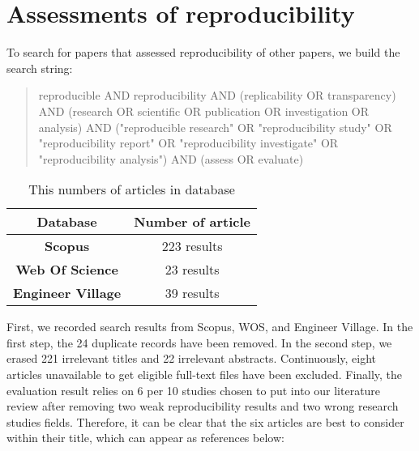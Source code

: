 \documentclass[
10pt, %
a4paper, %
oneside, %
headinclude,footinclude, %
BCOR5mm, %
]{scrartcl}
\begin{document}
\newpage %



\section{Assessments of reproducibility}
To search for papers that assessed reproducibility of other papers, we build the search string:
\begin{quote}
reproducible AND reproducibility AND (replicability OR transparency) AND (research OR scientific OR publication OR investigation OR analysis) AND ("reproducible research" OR "reproducibility study" OR "reproducibility report" OR "reproducibility investigate" OR 
"reproducibility analysis") AND (assess OR evaluate)
\end{quote}

\begin{table}[h]
\centering
\begin{tabular}{|c|clll|}
\hline
Database                	& \multicolumn{4}{c|}{\textbf{Number of article}}           \\ \hline
\textbf{Scopus} 			& \multicolumn{4}{c|}{{\color[HTML]{329A9D} 223 results}} 	\\ \hline
\textbf{Web Of Science} 	& \multicolumn{4}{c|}{{\color[HTML]{329A9D} 23 results}}    \\ \hline
\textbf{Engineer Village}	& \multicolumn{4}{c|}{{\color[HTML]{329A9D} 39 results}}   \\ \hline
\end{tabular}
\caption{This numbers of articles in database}
\label{table1}
\end{table}
First, we recorded search results from Scopus, WOS, and Engineer Village. In the first step, the 24 duplicate records have been removed. In the second step, we erased 221 irrelevant titles and 22 irrelevant abstracts. Continuously, eight articles unavailable to get eligible full-text files have been excluded. Finally, the evaluation result relies on 6 per 10 studies chosen to put into our literature review after removing two weak reproducibility results and two wrong research studies fields. Therefore, it can be clear that the six articles are best to consider within their title, which can appear as references below:
\end{document}

